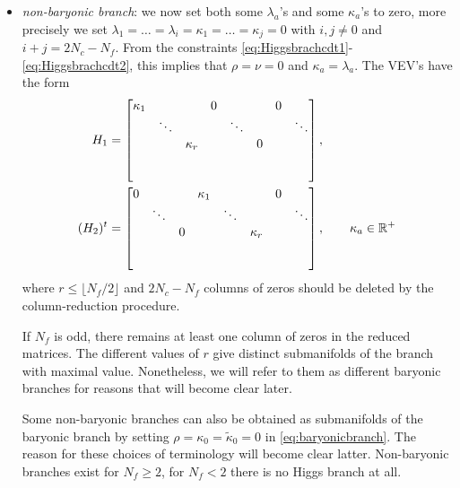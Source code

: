 \begin{itemize}
\begin{itemize}[label=$\triangleright$]
                    \item \emph{non-baryonic branch}: we now set both some $\lambda_a$'s and some $\kappa_a$'s to zero, more precisely we set $\lambda_1=\dots=\lambda_i=\kappa_1=\dots=\kappa_j=0$ with $i,j\neq0$ and $i+j=2N_c-N_f$. From the constraints \eqref{eq:Higgsbrachcdt1}-\eqref{eq:Higgsbrachcdt2}, this implies that $\rho=\nu=0$ and $\kappa_a=\lambda_a$. The VEV's have the form
                    \begin{align}
                        \begin{split}
                            H_1 &= 
                            \begin{bmatrix}
                                \kappa_1 & & & 0 & & & 0 & \\
                                & \ddots & & & \ddots & & & \ddots \\
                                & & \kappa_r & & & 0 & & \\
                                & & & & & & & \\
                                & & & & & & &
                            \end{bmatrix},\\
                            (H_2)^t &= 
                            \begin{bmatrix}
                                0 & & & \kappa_1 & & & 0 & \\
                                & \ddots & & & \ddots & & & \ddots \\
                                & & 0 & & & \kappa_r & & \\
                                & & & & & & & \\
                                & & & & & & &
                            \end{bmatrix},\qquad\kappa_a\in\mathbb{R}^+\\
                        \end{split}\label{eq:nonbaryonicbranch}
                    \end{align}
                    where $r\leq \lfloor N_f/2\rfloor$ and $2N_c-N_f$ columns of zeros should be deleted by the column-reduction procedure. 
                    
                    If $N_f$ is odd, there remains at least one column of zeros in the reduced matrices. The different values of $r$ give distinct submanifolds of the branch with maximal value. Nonetheless, we will refer to them as different baryonic branches for reasons that will become clear later.
                    
                    Some non-baryonic branches can also be obtained as submanifolds of the baryonic branch by setting $\rho=\kappa_0=\tilde{\kappa}_0=0$ in \eqref{eq:baryonicbranch}. The reason for these choices of terminology will become clear latter. Non-baryonic branches exist for $N_f\geq2$, for $N_f<2$ there is no Higgs branch at all.
                \end{itemize}
            \end{itemize}
        
